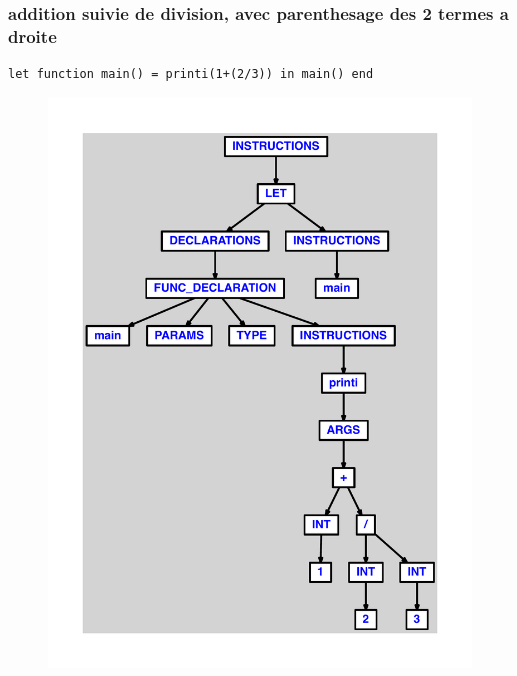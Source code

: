 \documentclass{article}
\begin{document}
\subsubsection{addition suivie de division, avec parenthesage des 2 termes a droite}
\begin{lstlisting}
let function main() = printi(1+(2/3)) in main() end
\end{lstlisting}
\newpage
\begin{figure}[H]
\centering
\includegraphics[max width=\textwidth]{ast/ast_90.pdf}
\end{figure}
\newpage
\end{document}
